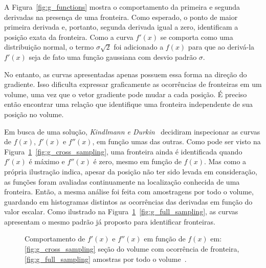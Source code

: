 	A Figura~\ref{fig:g_functions} mostra o comportamento da primeira e segunda derivadas na presença de uma fronteira. Como esperado, o ponto de maior primeira derivada e, portanto, segunda derivada igual a zero, identificam a posição exata da fronteira. Como a curva $f'(x)$ se comporta como uma distribuição normal, o termo $ \sigma\sqrt{2} $ foi adicionado a $ f(x) $ para que ao derivá-la $ f'(x) $ seja de fato uma função gaussiana com desvio padrão $ \sigma $.
	
	No entanto, as curvas apresentadas apenas possuem essa forma na direção do gradiente. Isso dificulta expressar graficamente as ocorrências de fronteiras em um volume, uma vez que o vetor gradiente pode mudar a cada posição. É preciso então encontrar uma relação que identifique uma fronteira independente de sua posição no volume.
	
	Em busca de uma solução, \textit{Kindlmann e Durkin}~\cite{gordon} decidiram inspecionar as curvas de $ f(x) $, $ f'(x) $ e $ f''(x) $, em função umas das outras. Como pode ser visto na Figura~\ref{fig:g_sampling}~\ref{fig:g_cross_sampling}, uma fronteira ainda é identificada quando $ f'(x) $ é máximo e $ f''(x) $ é zero, mesmo em função de $ f(x) $. Mas como a própria ilustração indica, apesar da posição não ter sido levada em consideração, as funções foram avaliadas continuamente na localização conhecida de uma fronteira. Então, a mesma análise foi feita com amostragens por todo o volume, guardando em histogramas distintos as ocorrências das derivadas em função do valor escalar. Como ilustrado na Figura~\ref{fig:g_sampling}~\ref{fig:g_full_sampling}, as curvas apresentam o mesmo padrão já proposto para identificar fronteiras.
	
\begin{figure}[t]
	\centering
	\caption{Comportamento de $ f'(x) $ e $ f''(x) $ em função de $ f(x) $ em: \ref{fig:g_cross_sampling} seção do volume com ocorrência de fronteira, \ref{fig:g_full_sampling} amostras por todo o volume~\cite{gordon}.}
	\label{fig:g_sampling}
\end{figure}

